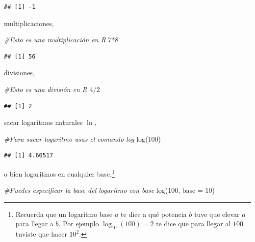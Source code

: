 \documentclass[
]{book}
\newenvironment{Shaded}{\begin{snugshade}}{\end{snugshade}}
\newcommand{\AttributeTok}[1]{\textcolor[rgb]{0.77,0.63,0.00}{#1}}
\newcommand{\CommentTok}[1]{\textcolor[rgb]{0.56,0.35,0.01}{\textit{#1}}}
\newcommand{\DecValTok}[1]{\textcolor[rgb]{0.00,0.00,0.81}{#1}}
\newcommand{\FunctionTok}[1]{\textcolor[rgb]{0.00,0.00,0.00}{#1}}
\newcommand{\NormalTok}[1]{#1}
\newcommand{\SpecialCharTok}[1]{\textcolor[rgb]{0.00,0.00,0.00}{#1}}
\begin{document}
\begin{verbatim}
## [1] -1
\end{verbatim}

multiplicaciones,

\begin{Shaded}
\begin{Highlighting}[]
\CommentTok{\#Esto es una multiplicación en R}
\DecValTok{7}\SpecialCharTok{*}\DecValTok{8}
\end{Highlighting}
\end{Shaded}

\begin{verbatim}
## [1] 56
\end{verbatim}

divisiones,

\begin{Shaded}
\begin{Highlighting}[]
\CommentTok{\#Esto es una división en R}
\DecValTok{4}\SpecialCharTok{/}\DecValTok{2}
\end{Highlighting}
\end{Shaded}

\begin{verbatim}
## [1] 2
\end{verbatim}

sacar logaritmos naturales \(\ln\),

\begin{Shaded}
\begin{Highlighting}[]
\CommentTok{\#Para sacar logaritmo usas el comando log}
\FunctionTok{log}\NormalTok{(}\DecValTok{100}\NormalTok{)}
\end{Highlighting}
\end{Shaded}

\begin{verbatim}
## [1] 4.60517
\end{verbatim}

o bien logaritmos en cualquier base,\footnote{Recuerda que un logaritmo base \(a\) te dice a qué potencia \(b\) tuve que elevar \(a\) para llegar a \(b\). Por ejemplo \(\log_{10}(100) = 2\) te dice que para llegar al \(100\) tuviste que hacer \(10^2\).}

\begin{Shaded}
\begin{Highlighting}[]
\CommentTok{\#Puedes especificar la base del logaritmo con base }
\FunctionTok{log}\NormalTok{(}\DecValTok{100}\NormalTok{, }\AttributeTok{base =} \DecValTok{10}\NormalTok{)}
\end{Highlighting}
\end{Shaded}
\end{document}
